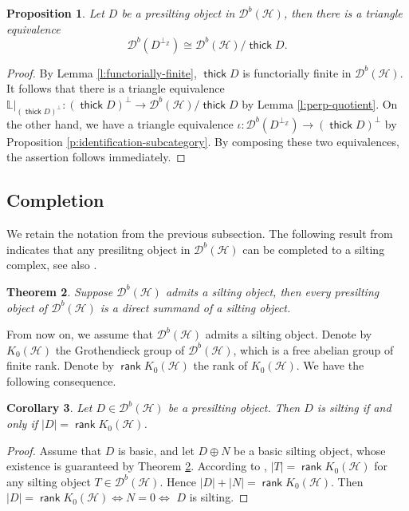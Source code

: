 \documentclass[12pt,a4paper,reqno]{amsart}
\newtheorem{theorem}{Theorem}[section]
\newtheorem{proposition}[theorem]{Proposition}
\newtheorem{corollary}[theorem]{Corollary}
\theoremstyle{definition}
\newcommand{\opname}[1]{\operatorname{\mathsf{#1}}}
\newcommand{\der}{\cd}
\newcommand{\rank}{\opname{rank}\nolimits}
\newcommand{\thick}{\opname{thick}}
\newcommand{\cd}{{\mathcal D}}
\begin{document}
\begin{proposition}\label{p: quotient-by-presilting}
Let $D$ be a presilting object in $\der^b(\mathcal{H})$, then there is a triangle equivalence \[ \der^b(D^{\perp_{\mathbb{Z}}}) \cong \der^b(\mathcal{H})/\thick{D}. \]
\end{proposition}
\begin{proof}
By Lemma \ref{l:functorially-finite}, $\thick D$ is functorially finite in $\der^b(\mathcal{H})$. It follows that there is a triangle equivalence $\mathbb{L}|_{(\thick D)^\perp}: (\thick D)^\perp\to \der^b(\mathcal{H})/\thick D$  by Lemma \ref{l:perp-quotient}.  On the other hand, we have a triangle equivalence $\iota: \der^b(D^{\perp_\mathbb{Z}})\to (\thick D)^\perp$ by Proposition \ref{p:identification-subcategory}.
By composing these two equivalences, the assertion follows immediately.
\end{proof}




\subsection{Completion} We retain the notation from the previous subsection. The following result from \cite{DF} indicates that any presilitng object in $\der^b(\mathcal{H})$ can be completed to a silting complex, see also \cite{BY}.

\begin{theorem}\cite[Theorems 1.1, 1.2]{DF} \label{t:completion-for-presilting}
Suppose $\der^b(\mathcal{H})$ admits a silting object, then every presilting object of $\der^b(\mathcal{H})$ is a direct summand of a silting object.
\end{theorem}

From now on, we assume that $\der^b(\mathcal{H})$ admits a silting object.
Denote by $K_0(\mathcal{H})$ the Grothendieck group of $\der^b(\mathcal{H})$, which is a free abelian group of finite rank. Denote by $\rank K_0(\mathcal{H})$ the rank of $K_0(\mathcal{H})$. We have the following consequence.

\begin{corollary}\label{c:cardinality}
Let $D \in \der^b(\mathcal{H})$ be a presilting object. Then $D$ is silting if and only if $|D| = \rank K_0(\mathcal{H})$.
\end{corollary}
\begin{proof}
Assume that $D$ is basic, and let $D \oplus N$ be a basic silting object, whose existence is guaranteed by Theorem \ref{t:completion-for-presilting}. According to \cite[Theorem 2.27]{AiharaIyama}, $|T| = \rank K_0(\mathcal{H})$ for any silting object $T \in \der^b(\mathcal{H})$. Hence $|D| + |N| = \rank K_0(\mathcal{H})$. Then $|D| = \rank K_0(\mathcal{H}) \iff N = 0 \iff$ $D$ is silting.
\end{proof}
\end{document}
